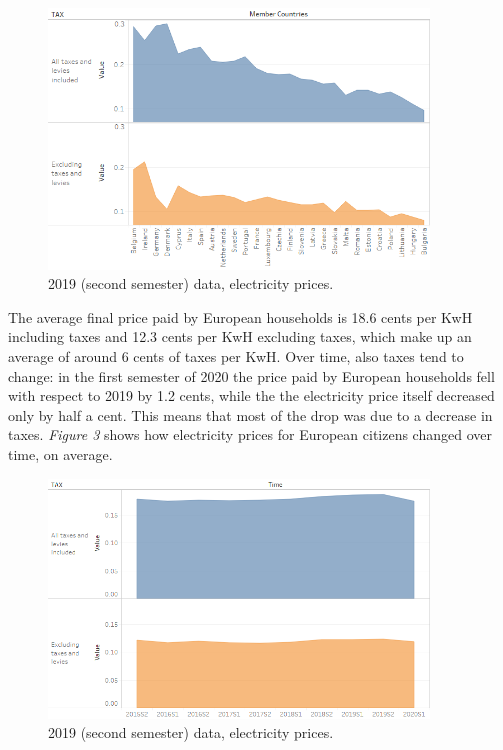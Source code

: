 \documentclass{book}
\begin{document}
\bigskip
\begin{figure}[H]
\begin{center}
\captionsetup{justification=centering}
\includegraphics[width=0.9\textwidth]{Images/Taxes.png}
\caption{2019 (second semester) data, electricity prices. }
\end{center}
\end{figure}
\bigskip

The average final price paid by European households is 18.6 cents per KwH including taxes and 12.3 cents per KwH excluding taxes, which make up an average of around 6 cents of taxes per KwH. Over time, also taxes tend to change: in the first semester of 2020 the price paid by European households fell with respect to 2019 by 1.2 cents, while the the electricity price itself decreased only by half a cent. This means that most of the drop was due to a decrease in taxes. \textit{Figure 3} shows how electricity prices for European citizens changed over time, on average.

\bigskip
\begin{figure}[H]
\begin{center}
\captionsetup{justification=centering}
\includegraphics[width=0.9\textwidth]{Images/TaxesTime.png}
\caption{2019 (second semester) data, electricity prices. }
\end{center}
\end{figure}
\bigskip
\end{document}
